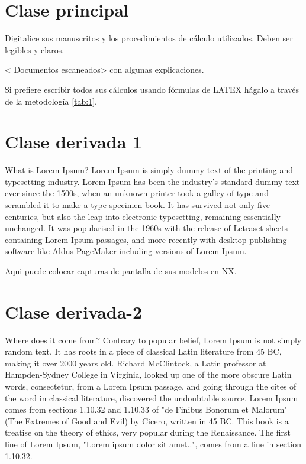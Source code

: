 
\appendix
\renewcommand{\appendixname}{Anexos}
\renewcommand{\appendixtocname}{Anexos}
\renewcommand{\appendixpagename}{Anexos}
\clearpage %
\appendixpage

	\section{Clase principal \label{appendix:clase-pri}}
	
	Digitalice sus manuscritos y los procedimientos de cálculo utilizados. Deben ser legibles y claros.
	
	< Documentos escaneados> con algunas explicaciones.
	
	Si prefiere escribir todos sus cálculos usando fórmulas de LATEX hágalo a través de la metodología \ref{tab:1}. 
	

		
	\newpage
	\section{Clase derivada 1 \label{appendix:clase-derivada-1}}
	
	What is Lorem Ipsum?
	Lorem Ipsum is simply dummy text of the printing and typesetting industry. Lorem Ipsum has been the industry's standard dummy text ever since the 1500s, when an unknown printer took a galley of type and scrambled it to make a type specimen book. It has survived not only five centuries, but also the leap into electronic typesetting, remaining essentially unchanged. It was popularised in the 1960s with the release of Letraset sheets containing Lorem Ipsum passages, and more recently with desktop publishing software like Aldus PageMaker including versions of Lorem Ipsum.
	
	Aqui puede colocar capturas de pantalla de sus modelos en NX. 
	
	\newpage
	\section{Clase derivada-2 \label{appendix:clase-derivada-2}}
	
	Where does it come from?
	Contrary to popular belief, Lorem Ipsum is not simply random text. It has roots in a piece of classical Latin literature from 45 BC, making it over 2000 years old. Richard McClintock, a Latin professor at Hampden-Sydney College in Virginia, looked up one of the more obscure Latin words, consectetur, from a Lorem Ipsum passage, and going through the cites of the word in classical literature, discovered the undoubtable source. Lorem Ipsum comes from sections 1.10.32 and 1.10.33 of "de Finibus Bonorum et Malorum" (The Extremes of Good and Evil) by Cicero, written in 45 BC. This book is a treatise on the theory of ethics, very popular during the Renaissance. The first line of Lorem Ipsum, "Lorem ipsum dolor sit amet..", comes from a line in section 1.10.32.
